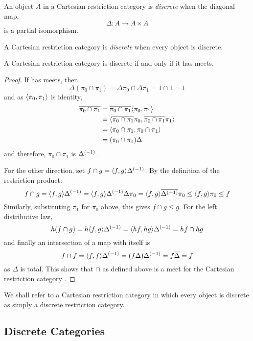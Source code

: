 \begin{definition}
  An object $A$ in a Cartesian restriction category is \emph{discrete}
  when the diagonal map,
  \[
    \Delta:A \to A \times A
  \]
  is a partial isomorphism.

  A Cartesian restriction category is \emph{discrete} when every object is discrete.
\end{definition}

\begin{theorem}\label{thm:a_crc_is_discrete_iff_it_has_meets}
  A Cartesian restriction category \X is discrete if and only if it has meets.
\end{theorem}
\begin{proof}
  If \X has meets, then
  \[
    \Delta(\pi_0 \cap \pi_1) = \Delta\pi_0 \cap \Delta\pi_1 = 1\cap 1 = 1
  \]
  and as $\langle\pi_0,\pi_1\rangle$ is identity,
  \begin{align*}
    \overline{\pi_0 \cap \pi_1} &= \overline{\pi_0 \cap \pi_1} \langle\pi_0, \pi_1\rangle \\
    &=\langle\overline{\pi_0 \cap \pi_1}\pi_0, \overline{\pi_0 \cap \pi_1}\pi_1\rangle\\
    &=\langle\pi_0 \cap \pi_1,\pi_0 \cap \pi_1\rangle\\
    &=(\pi_0 \cap \pi_1 )\Delta
  \end{align*}
  and therefore, $\pi_0 \cap \pi_1$ is ${\Delta}^{(-1)}$.

  For the other direction, set $f\cap g = \langle f,g\rangle{\Delta}^{(-1)}$.
  By the definition of the restriction product:
  \[
    f \cap g =  \langle f,g\rangle{\Delta}^{(-1)} =\langle f,g\rangle{\Delta}^{(-1)} \Delta \pi_0 =
      \langle f,g\rangle\overline{{\Delta}^{(-1)}}\pi_0 \le \langle f,g\rangle\pi_0 \le f
  \]
  Similarly, substituting $\pi_1$ for $\pi_0$ above, this gives $f \cap g \le g$.
  For the left distributive law,
  \[
    h(f \cap g) = h \langle f,g\rangle{\Delta}^{(-1)} =  \langle h f,h g\rangle{\Delta}^{(-1)} = h f \cap h g
  \]
  and finally an intersection of a map with itself is
  \[
    f\cap f = \langle f,f\rangle {\Delta}^{(-1)} = (f \Delta) {\Delta}^{(-1)} = f \overline{\Delta} = f
  \]
  as $\Delta$ is total. This shows that $\cap$ as defined above is a meet for the
  Cartesian restriction category \X.

\end{proof}

We shall refer to a Cartesian restriction category in which every object is
discrete as simply a discrete restriction category.

\subsection{Discrete Categories} %
\label{sub:discrete_categories}


